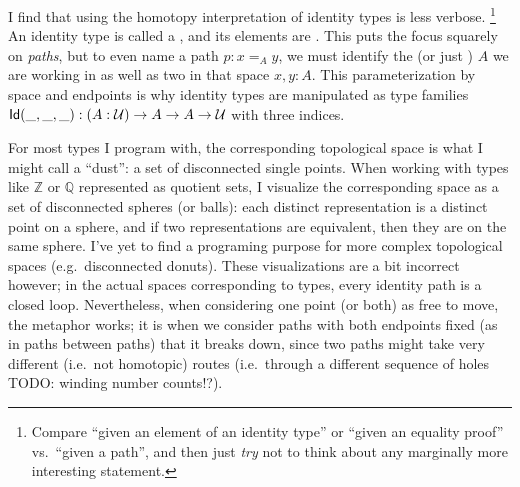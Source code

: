 \documentclass[11pt]{article} %
\theoremstyle{definition}
\theoremstyle{remark}
\begin{document}
I find that using the homotopy interpretation of identity types is less verbose.%
  \footnote{Compare ``given an element of an identity type'' or ``given an equality proof'' vs.\ ``given a path'', and then just \emph{try} not to think about any marginally more interesting statement.}
An identity type is called a , and its elements are .
This puts the focus squarely on \emph{paths}, but to even name a path $p : x =_{\!A} y$, we must identify the  (or just ) $A$ we are working in as well as two  in that space $x, y : A$.
This parameterization by space and endpoints is why identity types are manipulated as type families $\mathsf{Id}(\_, \_, \_) : ({A}:{\mathcal{U}}) \to A \to A \to \mathcal{U}$ with three indices.

For most types I program with, the corresponding topological space is what I might call a ``dust'': a set of disconnected single points.
When working with types like $\mathbb Z$ or $\mathbb Q$ represented as quotient sets, I visualize the corresponding space as a set of disconnected spheres (or balls): each distinct representation is a distinct point on a sphere, and if two representations are equivalent, then they are on the same sphere.
I've yet to find a programing purpose for more complex topological spaces (e.g.\ disconnected donuts).
These visualizations are a bit incorrect however; in the actual spaces corresponding to types, every identity path is a closed loop.
Nevertheless, when considering one point (or both) as free to move, the metaphor works; it is when we consider paths with both endpoints fixed (as in paths between paths) that it breaks down, since two paths might take very different (i.e.\ not homotopic) routes (i.e.\ through a different sequence of holes TODO: winding number counts!?).
\end{document}
